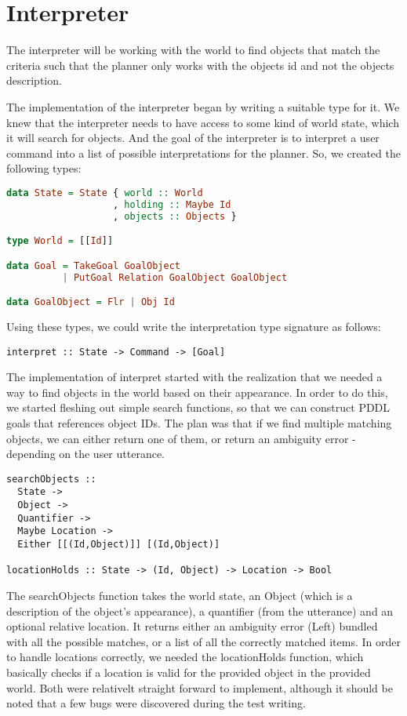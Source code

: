 \section*{Interpreter}
The interpreter will be working with the world to find objects that match the
criteria such that the planner only works with the objects id and not the
objects description.

The implementation of the interpreter began by writing a suitable type for it. We knew that the interpreter needs to have access to some kind of world state, which it will search for objects. And the goal of the interpreter is to interpret a user command into a list of possible interpretations for the planner. So, we created the following types:

\begin{lstlisting}[language=haskell]
data State = State { world :: World
                   , holding :: Maybe Id
                   , objects :: Objects }

type World = [[Id]]

data Goal = TakeGoal GoalObject
          | PutGoal Relation GoalObject GoalObject

data GoalObject = Flr | Obj Id
\end{lstlisting}
Using these types, we could write the interpretation type signature as follows:

\begin{lstlisting}
interpret :: State -> Command -> [Goal]
\end{lstlisting}

The implementation of interpret started with the realization that we needed a way to find objects in the world based on their appearance. In order to do this, we started fleshing out simple search functions, so that we can construct PDDL goals that references object IDs. The plan was that if we find multiple matching objects, we can either return one of them, or return an ambiguity error - depending on the user utterance.

\begin{lstlisting}
searchObjects ::
  State ->
  Object ->
  Quantifier ->
  Maybe Location ->
  Either [[(Id,Object)]] [(Id,Object)]

locationHolds :: State -> (Id, Object) -> Location -> Bool
\end{lstlisting}

The searchObjects function takes the world state, an Object (which is a description of the object's appearance), a quantifier (from the utterance) and an optional relative location. It returns either an ambiguity error (Left) bundled with all the possible matches, or a list of all the correctly matched items. In order to handle locations correctly, we needed the locationHolds function, which basically checks if a location is valid for the provided object in the provided world. Both were relativelt straight forward to implement, although it should be noted that a few bugs were discovered during the test writing.

